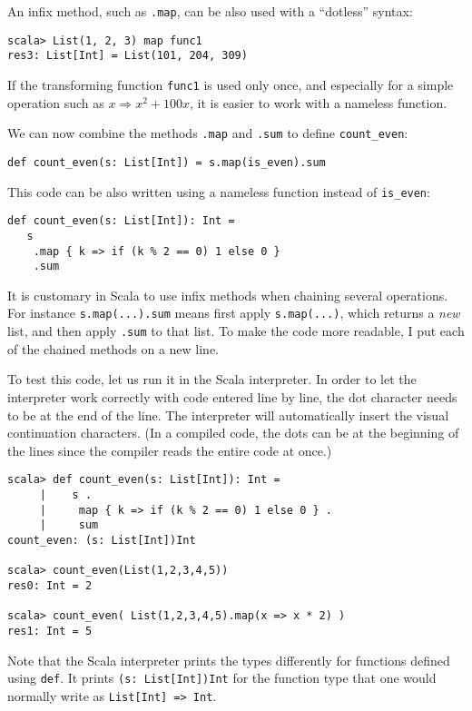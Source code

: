 An infix method, such as \lstinline!.map!, can be also used with
a ``dotless'' syntax:
\begin{lstlisting}
scala> List(1, 2, 3) map func1
res3: List[Int] = List(101, 204, 309)
\end{lstlisting}

If the transforming function \lstinline!func1! is used only once,
and especially for a simple operation such as $x\Rightarrow x^{2}+100x$,
it is easier to work with a nameless function.

We can now combine the methods \texttt{}\lstinline!.map! and \texttt{}\lstinline!.sum!
to define \lstinline!count_even!:

\begin{lstlisting}
def count_even(s: List[Int]) = s.map(is_even).sum
\end{lstlisting}

This code can be also written using a nameless function instead of
\lstinline!is_even!:

\begin{lstlisting}
def count_even(s: List[Int]): Int =
   s
    .map { k => if (k % 2 == 0) 1 else 0 }
    .sum
\end{lstlisting}

It is customary in Scala to use infix methods when chaining several
operations. For instance \lstinline!s.map(...).sum! means first apply
\lstinline!s.map(...)!, which returns a \emph{new} list, and then
apply \texttt{}\lstinline!.sum! to that list. To make the code more
readable, I put each of the chained methods on a new line. 

To test this code, let us run it in the Scala interpreter. In order
to let the interpreter work correctly with code entered line by line,
the dot character needs to be at the end of the line. The interpreter
will automatically insert the visual continuation characters. (In
a compiled code, the dots can be at the beginning of the lines since
the compiler reads the entire code at once.)
\begin{lstlisting}
scala> def count_even(s: List[Int]): Int =
     |    s .
     |     map { k => if (k % 2 == 0) 1 else 0 } .
     |     sum
count_even: (s: List[Int])Int

scala> count_even(List(1,2,3,4,5))
res0: Int = 2

scala> count_even( List(1,2,3,4,5).map(x => x * 2) )
res1: Int = 5
\end{lstlisting}
Note that the Scala interpreter prints the types differently for functions
defined using \lstinline!def!. It prints \lstinline!(s: List[Int])Int!
for the function type that one would normally write as \lstinline!List[Int] => Int!.

